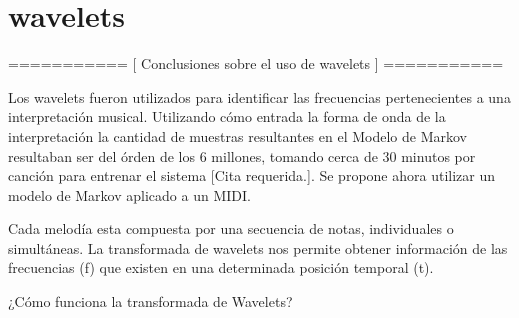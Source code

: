 \section{wavelets}

  =========== [ Conclusiones sobre el uso de wavelets ] ===========

  Los wavelets fueron utilizados para identificar las frecuencias pertenecientes a una interpretación musical. Utilizando cómo entrada la forma de onda de la interpretación la cantidad de muestras resultantes en el Modelo de Markov resultaban ser del órden de los 6 millones, tomando cerca de 30 minutos por canción para entrenar el sistema [Cita requerida.]. Se propone ahora utilizar un modelo de Markov aplicado a un MIDI.



  Cada melodía esta compuesta por una secuencia de notas, individuales o simultáneas.
  La transformada de wavelets nos permite obtener información de las frecuencias (f) que existen en una determinada posición temporal (t).

    ¿Cómo funciona la transformada de Wavelets?
